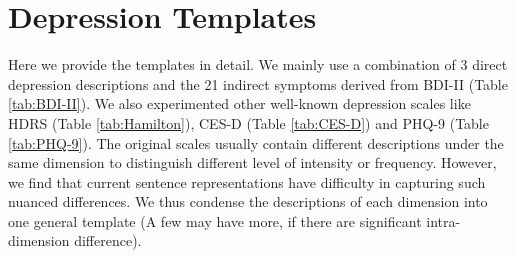 \documentclass[letterpaper]{article} %
\begin{document}

\section{Depression Templates}

Here we provide the templates in detail. We mainly use a combination of 3 direct depression descriptions and the 21 indirect symptoms derived from BDI-II (Table \ref{tab:BDI-II}). We also experimented other well-known depression scales like HDRS (Table \ref{tab:Hamilton}), CES-D (Table \ref{tab:CES-D}) and PHQ-9 (Table \ref{tab:PHQ-9}). The original scales usually contain different descriptions under the same dimension to distinguish different level of intensity or frequency. However, we find that current sentence representations have difficulty in capturing such nuanced differences. We thus condense the descriptions of each dimension into one general template (A few may have more, if there are significant intra-dimension difference).
\end{document}
